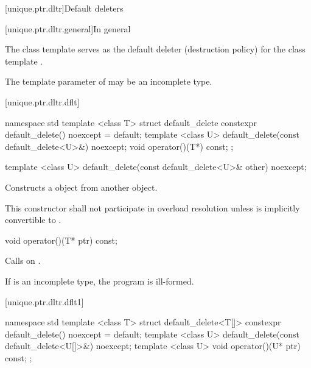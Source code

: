 [unique.ptr.dltr]{Default deleters}

[unique.ptr.dltr.general]{In general}

\pnum
The class template  serves as the default deleter (destruction policy)
for the class template .

\pnum
The template parameter  of  may be
an incomplete type.

[unique.ptr.dltr.dflt]{}

\begin{codeblock}
namespace std {
  template <class T> struct default_delete {
    constexpr default_delete() noexcept = default;
    template <class U> default_delete(const default_delete<U>&) noexcept;
    void operator()(T*) const;
  };
}
\end{codeblock}

\begin{itemdecl}
template <class U> default_delete(const default_delete<U>& other) noexcept;
\end{itemdecl}

\begin{itemdescr}
\pnum
\effects Constructs a  object
from another  object.

\pnum
\remarks This constructor shall not participate in overload resolution unless
 is implicitly convertible to .
\end{itemdescr}

\begin{itemdecl}
void operator()(T* ptr) const;
\end{itemdecl}

\begin{itemdescr}
\pnum
\effects Calls  on .

\pnum
\remarks If  is an incomplete type, the program is ill-formed.
\end{itemdescr}

[unique.ptr.dltr.dflt1]{}

\begin{codeblock}
namespace std {
  template <class T> struct default_delete<T[]> {
    constexpr default_delete() noexcept = default;
    template <class U> default_delete(const default_delete<U[]>&) noexcept;
    template <class U> void operator()(U* ptr) const;
  };
}
\end{codeblock}

